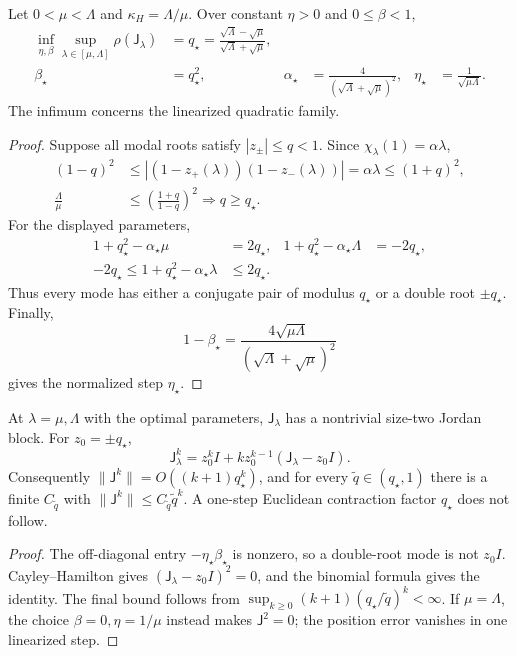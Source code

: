 \begin{theorem}
\label{thm:local-optimal-hb}
Let $0<\mu<\Lambda$ and $\kappa_H=\Lambda/\mu$. Over constant
$\eta>0$ and $0\leq\beta<1$,
\begin{align}
\inf_{\eta,\beta}\sup_{\lambda\in[\mu,\Lambda]}
\rho(\mathsf J_\lambda)
&=q_\star
=\frac{\sqrt\Lambda-\sqrt\mu}{\sqrt\Lambda+\sqrt\mu},\\
\beta_\star&=q_\star^2,&
\alpha_\star&=\frac4{(\sqrt\Lambda+\sqrt\mu)^2},&
\eta_\star&=\frac1{\sqrt{\mu\Lambda}} .
\label{eq:local-optimal-hb}
\end{align}
The infimum concerns the linearized quadratic family.
\end{theorem}
\begin{proof}
Suppose all modal roots satisfy $|z_\pm|\leq q<1$. Since
$\chi_\lambda(1)=\alpha\lambda$,
\begin{align}
(1-q)^2&\leq
|(1-z_+(\lambda))(1-z_-(\lambda))|
=\alpha\lambda\leq(1+q)^2,\\
\frac{\Lambda}{\mu}
&\leq\left(\frac{1+q}{1-q}\right)^2
\Longrightarrow q\geq q_\star .
\end{align}
For the displayed parameters,
\begin{align}
1+q_\star^2-\alpha_\star\mu&=2q_\star,&
1+q_\star^2-\alpha_\star\Lambda&=-2q_\star,\\
-2q_\star\leq1+q_\star^2-\alpha_\star\lambda
&\leq2q_\star .
\end{align}
Thus every mode has either a conjugate pair of modulus $q_\star$
or a double root $\pm q_\star$. Finally,
\begin{equation}
1-\beta_\star=
\frac{4\sqrt{\mu\Lambda}}{(\sqrt\Lambda+\sqrt\mu)^2}
\end{equation}
gives the normalized step $\eta_\star$.
\end{proof}

\begin{proposition}
\label{prop:local-jordan}
At $\lambda=\mu,\Lambda$ with the optimal parameters,
$\mathsf J_\lambda$ has a nontrivial size-two Jordan block.
For $z_0=\pm q_\star$,
\begin{equation}
\mathsf J_\lambda^k
=z_0^kI+kz_0^{k-1}(\mathsf J_\lambda-z_0I).
\label{eq:local-jordan}
\end{equation}
Consequently $\|\mathsf J^k\|=O((k+1)q_\star^k)$, and for
every $\widetilde q\in(q_\star,1)$ there is a finite
$C_{\widetilde q}$ with
$\|\mathsf J^k\|\leq C_{\widetilde q}\widetilde q^k$.
A one-step Euclidean contraction factor $q_\star$ does not follow.
\end{proposition}
\begin{proof}
The off-diagonal entry $-\eta_\star\beta_\star$ is nonzero, so a
double-root mode is not $z_0I$. Cayley--Hamilton gives
$(\mathsf J_\lambda-z_0I)^2=0$, and the binomial formula gives the
identity. The final bound follows from
$\sup_{k\geq0}(k+1)(q_\star/\widetilde q)^k<\infty$.
If $\mu=\Lambda$, the choice $\beta=0,\eta=1/\mu$ instead makes
$\mathsf J^2=0$; the position error vanishes in one linearized step.
\end{proof}

